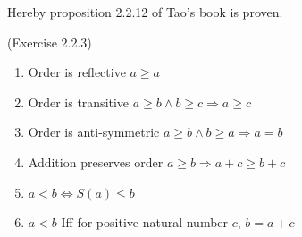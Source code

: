 Hereby proposition 2.2.12 of Tao's book is proven.
\begin{prop}
(Exercise 2.2.3) \label{exercise2.2.3}
\begin{enumerate}
\item Order is reflective $a \geq a$
\item Order is transitive $a \geq b \wedge b \geq c \Rightarrow a \geq c$
\item Order is anti-symmetric $a \geq b \wedge b \geq a \Rightarrow a=b$
\item Addition preserves order $a \geq b \Rightarrow a+c \geq b+c$
\item $a<b \Leftrightarrow S(a) \leq b$
\item $a<b$ Iff for positive natural number $c$, $b=a+c$
\end{enumerate}
\end{prop}
